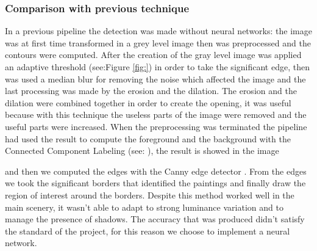 \subsubsection{Comparison with previous technique}
In a previous pipeline the detection was made without neural networks:
the image was at first time transformed in a grey level image then was preprocessed and the contours were computed. After the creation of the gray level image was applied an adaptive threshold (see:Figure \ref{fig:}) in order to take the significant edge, then was used a median blur for removing the noise which affected the image and the last processing was made by the erosion and the dilation.
The erosion and the dilation were combined together in order to create the opening, it was useful because with this technique the useless parts of the image were removed and the useful parts were increased.
When the preprocessing was terminated the pipeline had used the result to compute the foreground and the background with the Connected Component Labeling (see: \cite{Grana_ccl}), the result is showed in the image



and then we computed the edges with the Canny edge detector \cite{canny}. From the edges we took the significant borders that identified the paintings and finally draw the region of interest around the borders. Despite this method worked well in the main scenery, it wasn't able to adapt to strong luminance variation and to manage the presence of shadows.
The accuracy that was produced didn't satisfy the standard of the project, for this reason we choose to implement a neural network.

